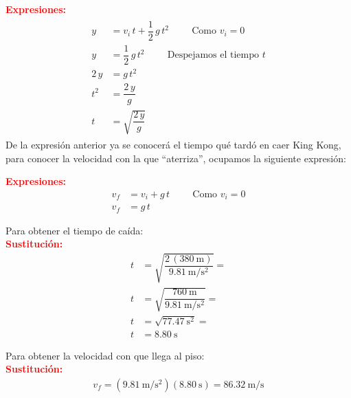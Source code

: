 \documentclass[14pt]{extarticle}
\newcommand{\textocolor}[2]{\textbf{\textcolor{#1}{#2}}}
\begin{document}
\vspace*{0.5cm}
\noindent
\textocolor{red}{Expresiones:}
\begin{eqnarray*}
\begin{aligned}
y &= v_{i} \, t + \dfrac{1}{2} \, g \, t^{2} \hspace{1cm} \text{Como } v_{i} = 0 \\[0.5em]
y &= \dfrac{1}{2} \, g \, t^{2} \hspace{1cm} \text{Despejamos el tiempo } t \\[0.5em]
2 \, y &= g \, t^{2} \\[0.5em]
t^{2} &= \dfrac{2 \, y}{g} \\[0.5em]
t &= \sqrt{\dfrac{2 \, y}{g}}
\end{aligned}
\end{eqnarray*}
De la expresión anterior ya se conocerá el tiempo qué tardó en caer King Kong, para conocer la velocidad con la que \enquote{aterriza}, ocupamos la siguiente expresión:

\noindent
\textocolor{red}{Expresiones:}
\begin{align*}
v_{f} &= v_{i} + g \, t \hspace{1cm} \text{Como } v_{i} = 0 \\[0.5em]
v_{f} &= g \, t
\end{align*}

\vspace{0.5cm}
\noindent
Para obtener el tiempo de caída: \\
\textocolor{red}{Sustitución:}
\begin{align*}
t &= \sqrt{\dfrac{2 \, (\SI{380}{\meter})}{ \displaystyle \SI[per-mode=fraction]{9.81}{\meter\per\square\second}}} = \\[0.5em]
t &= \sqrt{\dfrac{\SI{760}{\meter}}{\displaystyle \SI[per-mode=fraction]{9.81}{\meter\per\square\second}}} = \\[0.5em]
t &= \sqrt{ \SI{77.47}{\square\second}} = \\[0.5em]
t &= \SI{8.80}{\second}
\end{align*}

\vspace{0.5cm}
\noindent
Para obtener la velocidad con que llega al piso: \\
\textocolor{red}{Sustitución:}
\begin{align*}
v_{f} = \left( \SI[per-mode=fraction]{9.81}{\meter\per\square\second} \right) (\SI{8.80}{\second}) = \SI[per-mode=fraction]{86.32}{\meter\per\second}
\end{align*}
\end{document}
